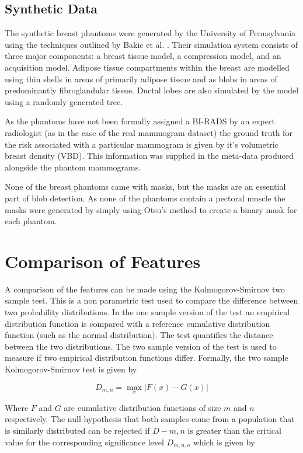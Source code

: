 \subsection{Synthetic Data}
The synthetic breast phantoms were generated by the University of Pennsylvania using the techniques outlined by Bakic et al. \cite{bakic2002mammogram1, bakic2002mammogram2, bakic2003mammogram3}. Their simulation system consists of three major components: a breast tissue model, a compression model, and an acquisition model. Adipose tissue compartments within the breast are modelled using thin shells in areas of primarily adipose tissue and as blobs in areas of predominantly fibroglandular tissue. Ductal lobes are also simulated by the model using a randomly generated tree. 

As the phantoms have not been formally assigned a BI-RADS by an expert radiologist (as in the case of the real mammogram dataset) the ground truth for the risk associated with a particular mammogram is given by it's volumetric breast density (VBD). This information was supplied in the meta-data produced alongside the phantom mammograms.

None of the breast phantoms came with masks, but the masks are an essential part of blob detection. As none of the phantoms contain a pectoral muscle the masks were generated by simply using Otsu's method \cite{otsu1975threshold} to create a binary mask for each phantom. 


\section{Comparison of Features}
A comparison of the features can be made using the Kolmogorov-Smirnov two sample test. This is a non parametric test used to compare the difference between two probability distributions. In the one sample version of the test an empirical distribution function is compared with a reference cumulative distribution function (such as the normal distribution). The test quantifies the distance between the two distributions. The two sample version of the test is used to measure if two empirical distribution functions differ. Formally, the two sample Kolmogorov-Smirnov test is given by \cite{realStatsTwoSampleKStest}

\begin{equation}
	D_{m,n} = \max\limits_x | F(x) - G(x) |
\end{equation}

Where $F$ and $G$ are cumulative distribution functions of size $m$ and $n$ respectively. The null hypothesis that both samples come from a population that is similarly distributed can be rejected if $D-{m,n}$ is greater than the critical value for the corresponding significance level $D_{m,n,a}$ which is given by


